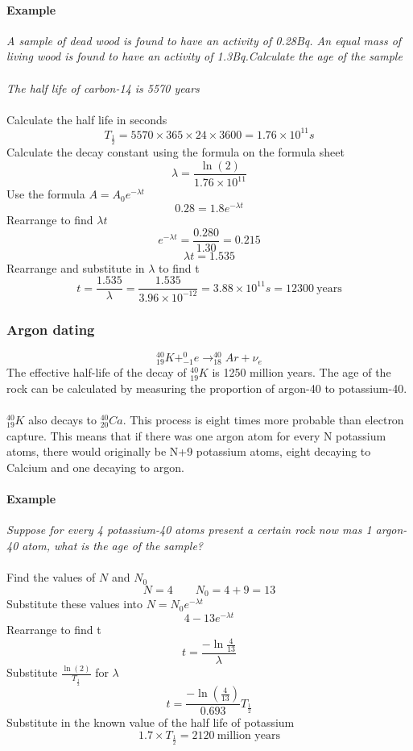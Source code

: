 \documentclass{article}[18pt]
\begin{document}
\paragraph{Example}
\textit{A sample of dead wood is found to have an activity of 0.28Bq. An equal mass of living wood is found to have an activity of 1.3Bq.Calculate the age of the sample\\
\\
The half life of carbon-14 is 5570 years }\\
\\
Calculate the half life in seconds
$$T_{\frac{1}{2}}=5570\times365\times24\times3600=1.76\times10^{11}s$$
Calculate the decay constant using the formula on the formula sheet
$$\lambda=\frac{\ln(2)}{1.76\times10^{11}}$$
Use the formula $A=A_0e^{-\lambda t}$
$$0.28=1.8e^{-\lambda t}$$
Rearrange to find $\lambda t$
$$e^{-\lambda t}=\frac{0.280}{1.30}=0.215$$
$$\lambda t=1.535$$
Rearrange and substitute in $\lambda$ to find t
$$t=\frac{1.535}{\lambda}=\frac{1.535}{3.96\times10^{-12}}=3.88\times10^{11}s=12300 \ \textrm{years}$$
\subsubsection{Argon dating}
$$^{40}_{19}K+^0_{-1}e\rightarrow^{40}_{18}Ar+\nu_e$$
The effective half-life of the decay of $^{40}_{19}K$ is 1250 million years. The age of the rock can be calculated by measuring the proportion of argon-40 to potassium-40.\\
\\
$^{40}_{19}K$ also decays to $^{40}_{20}Ca$. This process is eight times more probable than electron capture. This means that if there was one argon atom for every N potassium atoms, there would originally be N+9 potassium atoms, eight decaying to Calcium and one decaying to argon.
\paragraph{Example}
\textit{Suppose for every 4 potassium-40 atoms present a certain rock now mas 1 argon-40 atom, what is the age of the sample?}\\
\\
Find the values of $N$ and $N_0$ 
$$N=4 \qquad N_0=4+9=13$$
Substitute these values into $N=N_0e^{-\lambda t}$
$$4-13e^{-\lambda t}$$
Rearrange to find t 
$$t=\frac{-\ln\frac{4}{13}}{\lambda}$$
Substitute $\frac{\ln(2)}{T_{\frac{1}{2}}}$ for $\lambda$
$$t=\frac{-\ln(\frac{4}{13})}{0.693}T_{\frac{1}{2}}$$
Substitute in the known value of the half life of potassium
$$1.7\times T_{\frac{1}{2}}=2120 \  \textrm{million years}$$
\end{document}
